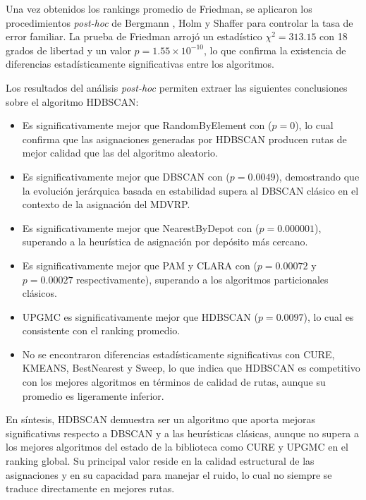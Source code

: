 Una vez obtenidos los rankings promedio de Friedman, se aplicaron los procedimientos \textit{post-hoc} de Bergmann \parencite{bergmannImprovementsGeneralMultiple1988}, Holm \parencite{holmSimpleSequentiallyRejective1979} y Shaffer \parencite{shafferModifiedSequentiallyRejective1986} para controlar la tasa de error familiar. La prueba de Friedman arroj\'o un estad\'istico $\chi^2 = 313.15$ con 18 grados de libertad y un valor $p = 1.55 \times 10^{-10}$, lo que confirma la existencia de diferencias estad\'isticamente significativas entre los algoritmos.

Los resultados del an\'alisis \textit{post-hoc} permiten extraer las siguientes conclusiones sobre el algoritmo HDBSCAN:

\begin{itemize}
  \item Es significativamente mejor que RandomByElement con ($p = 0$), lo cual confirma que las asignaciones generadas por HDBSCAN producen rutas de mejor calidad que las del algoritmo aleatorio.
  \item Es significativamente mejor que DBSCAN con ($p = 0.0049$), demostrando que la evoluci\'on jer\'arquica basada en estabilidad supera al DBSCAN cl\'asico en el contexto de la asignaci\'on del MDVRP.
  \item Es significativamente mejor que NearestByDepot con ($p = 0.000001$), superando a la heur\'istica de asignaci\'on por dep\'osito m\'as cercano.
  \item Es significativamente mejor que PAM y CLARA con ($p = 0.00072$ y $p = 0.00027$ respectivamente), superando a los algoritmos particionales cl\'asicos.
  \item UPGMC es significativamente mejor que HDBSCAN ($p = 0.0097$), lo cual es consistente con el ranking promedio.
  \item No se encontraron diferencias estad\'isticamente significativas con CURE, KMEANS, BestNearest y Sweep, lo que indica que HDBSCAN es competitivo con los mejores algoritmos en t\'erminos de calidad de rutas, aunque su promedio es ligeramente inferior.
\end{itemize}

En s\'intesis, HDBSCAN demuestra ser un algoritmo que aporta mejoras significativas respecto a DBSCAN y a las heur\'isticas cl\'asicas, aunque no supera a los mejores algoritmos del estado de la biblioteca como CURE y UPGMC en el ranking global. Su principal valor reside en la calidad estructural de las asignaciones y en su capacidad para manejar el ruido, lo cual no siempre se traduce directamente en mejores rutas.

